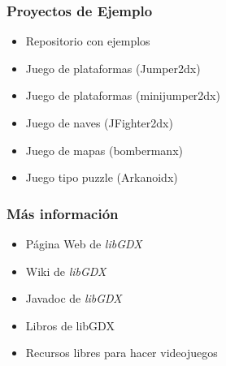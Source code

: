 \documentclass[xcolor={dvipsnames}]{beamer}
\begin{document}
\begin{frame}\frametitle{Proyectos de Ejemplo}
    \begin{itemize}
        \item Repositorio con ejemplos \href{https://github.com/codeandcoke/libgdx}{}
        \item Juego de plataformas (Jumper2dx) \href{https://github.com/codeandcoke/jumper2dx}{}
        \item Juego de plataformas (minijumper2dx) \href{https://github.com/codeandcoke/minijumper2dx}{}
        \item Juego de naves (JFighter2dx) \href{https://github.com/codeandcoke/jfighter2dx}{}
        \item Juego de mapas (bombermanx) \href{https://github.com/codeandcoke/jbombermanx}{}
        \item Juego tipo puzzle (Arkanoidx) \href{https://github.com/codeandcoke/arkanoidx}{}
    \end{itemize}
\end{frame}

\begin{frame}\frametitle{Más información}
    \begin{itemize}
        \item Página Web de \emph{\textcolor{resalta}{libGDX}} \href{https://libgdx.badlogicgames.com}{}
        \item Wiki de \emph{\textcolor{resalta}{libGDX}} \href{https://github.com/libgdx/libgdx/wiki}{}
        \item Javadoc de \emph{\textcolor{resalta}{libGDX}} \href{https://libgdx.badlogicgames.com/nightlies/docs/api}{}
        \item Libros de libGDX \href{https://www.packtpub.com/catalogsearch/result/?q=libgdx}{}
        \item Recursos libres para hacer videojuegos \href{https://opengameart.org}{}
    \end{itemize}
\end{frame}
\end{document}
